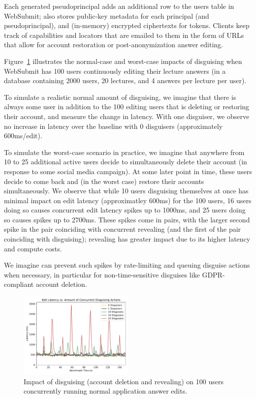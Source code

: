  Each generated pseudoprincipal adds an additional
row to the users table in WebSubmit; \sys also stores public-key metadata for each principal (and
pseudoprincipal), and (in-memory) encrypted ciphertexts for tokens.  Clients keep track of
capabilities and locators that are emailed to them in the form of URLs that allow for account
restoration or post-anonymization answer editing.

 Figure~\ref{fig:concurrent} illustrates the
normal-case and worst-case impacts of disguising when WebSubmit has 100 users continuously editing
their lecture answers (in a database containing 2000 users, 20 lectures, and 4 answers per lecture
per user).

To simulate a realistic normal amount of disguising, we imagine that there is always some user in
addition to the 100 editing users that is deleting or restoring their account, and measure the
change in latency. With one disguiser, we observe no increase in latency over the baseline with 0
disguisers (approximately 600ms/edit).

To simulate the worst-case scenario in practice, we imagine that anywhere from 10 to 25 additional
active users decide to simultaneously delete their account (\eg in response to some social media
campaign). At some later point in time, these users decide to come back and (in the worst case)
restore their accounts simultaneously. We observe that while 10 users disguising themselves at once
has minimal impact on edit latency (approximatley 600ms) for the 100 users, 16 users doing so causes
concurrent edit latency spikes up to 1000ms, and 25 users doing so causes spikes up to 2700ms.  
%
These spikes come in pairs, with the larger second spike in the pair coinciding with concurrent
revealing (and the first of the pair coinciding with disguising); revealing has greater impact due
to its higher latency and compute costs.

We imagine \sys can prevent such spikes by rate-limiting and queuing disguise actions when
necessary, in particular for non-time-sensitive disguises like GDPR-compliant account deletion.

\begin{figure}[t!]
    \centering
        \includegraphics[width=0.5\textwidth]{figs/concurrent_results_20lec_100users}
    \caption{Impact of disguising (account deletion and revealing) on 100 users concurrently running
    normal application answer edits.} 
    \label{fig:concurrent}
\end{figure}

